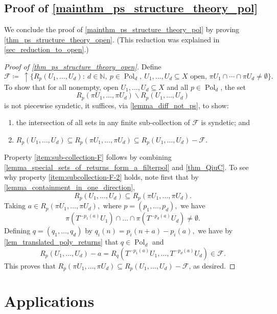 \documentclass{article}
\theoremstyle{plain}
\theoremstyle{claim}
\theoremstyle{definition}
\theoremstyle{plain}
\theoremstyle{plain}
\newcommand{\N}{\mathbb{N}}
\newcommand{\Pol}{\operatorname{Pol}}
\renewcommand{\setminus}{\backslash}
\newcommand{\1}{\boldsymbol{1}}
\newcommand{\defeq}{\coloneqq}
\newcommand{\family}{\mathscr{F}}
\begin{document}
\subsection{Proof of \texorpdfstring{\cref{mainthm_ps_structure_theory_pol}}{Theorem A}}

\label{sec:proof_a_open}

We conclude the proof of \cref{mainthm_ps_structure_theory_pol} by proving \cref{thm_ps_structure_theory_open}.  (This reduction was explained in \cref{sec_reduction_to_open}.)

\begin{proof}[Proof of \cref{thm_ps_structure_theory_open}]
Define
\[\family \defeq \ \uparrow \big\{ R_p(U_1,\ldots,U_d) : \ d\in\N, \ p\in\Pol_d, \ \text{$U_1,\ldots, U_d \subseteq X$ open, $\pi U_1\cap \cdots \cap \pi U_d \neq \emptyset$} \big\}.\]
To show that for all nonempty, open $U_1, \ldots, U_d \subseteq X$ and all $p\in\Pol_d$, the set
\[R_p(\pi U_1, \ldots, \pi U_d) \setminus R_p(U_1, \ldots, U_d)\]
is not piecewise syndetic, it suffices, via \cref{lemma_diff_not_ps}, to show:
\begin{enumerate}
    \item \label{item:sub-collection-F} the intersection of all sets in any finite sub-collection of $\family$ is syndetic; and 

    \item \label{item:subcollection-F-2} $R_p(U_1, \ldots, U_d)\subseteq R_p(\pi U_1, \ldots, \pi U_d) \subseteq R_p(U_1, \ldots, U_d)-\family.$
\end{enumerate}

Property \eqref{item:sub-collection-F} follows by combining \cref{lemma_special_sets_of_returns_form_a_filterpol} and \cref{thm_QiuC}.  To see why property \eqref{item:subcollection-F-2} holds, note first that by \cref{lemma_containment_in_one_direction},
\[R_p(U_1, \ldots, U_d)\subseteq R_p(\pi U_1, \ldots, \pi U_d).\]
Taking $a\in R_p(\pi U_1, \ldots, \pi U_d),$ where $p=(p_1,\ldots,p_d),$ we have 
\[
    \pi(T^{-p_1(a)}U_1)\cap \ldots\cap \pi(T^{-p_d(a)}U_d)\neq \emptyset.
\]
Defining $q=(q_1,\ldots,q_d)$ by $q_i(n) = p_i(n+a)-p_i(a),$ we have by \cref{lem_translated_poly_returns} that $q \in \Pol_d$ and
\[
    R_p(U_1, \ldots, U_d) - a = R_q(T^{-p_1(a)}U_1,\ldots, T^{-p_d(a)}U_d) \in \family.
\]
This proves that $R_p(\pi U_1, \ldots, \pi U_d) \subseteq R_p(U_1, \ldots, U_d)-\family$, as desired.
\end{proof}

\section{Applications}
\label{sec_applications}
\end{document}
